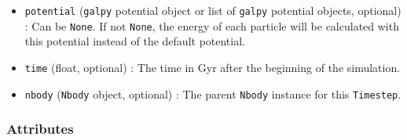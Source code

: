 \documentclass{article}
\begin{document}
\begin{itemize}
\item \verb!potential! (\verb!galpy! potential object or list of \verb!galpy! potential objects, optional) : Can be \verb!None!. If not \verb!None!, the energy of each particle will be calculated with this potential instead of the default \mwahpy potential. 

\item \verb!time! (float, optional) : The time in Gyr after the beginning of the simulation. 

\item \verb!nbody! (\verb!Nbody! object, optional) : The parent \verb!Nbody! instance for this \verb!Timestep!.

\end{itemize}

\subsubsection{Attributes}
\end{document}
